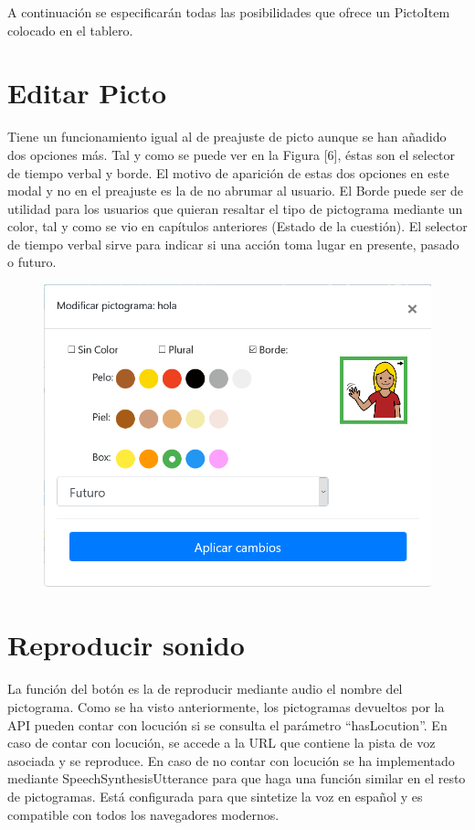 A continuación se especificarán todas las posibilidades que ofrece un PictoItem colocado en el tablero. 


\section*{Editar Picto}

Tiene un funcionamiento igual al de preajuste de picto aunque se han añadido dos opciones más. Tal y como se puede ver en la Figura [6], éstas son el selector de tiempo verbal y  borde. El motivo de aparición de estas dos opciones en este modal y no en el preajuste es la de no abrumar al usuario. El Borde puede ser de utilidad para los usuarios que quieran resaltar el tipo de pictograma mediante un color, tal y como se vio en capítulos anteriores (Estado de la cuestión). El selector de tiempo verbal sirve para indicar si una acción toma lugar en presente, pasado o futuro.

\begin{figure}[h!]
	\centering
	\includegraphics[width=0.7\linewidth]{Imagenes/Bitmap/modalEditarPicto}
	\caption{}
	\label{fig:modaleditarpicto}
\end{figure}


\section*{Reproducir sonido}


La función del botón es la de reproducir mediante audio el nombre del pictograma. Como se ha visto anteriormente, los pictogramas devueltos por la API pueden contar con locución si se consulta el parámetro “hasLocution”. En caso de contar con locución, se accede a la URL que contiene la pista de voz asociada y se reproduce. 
En caso de no contar con locución se ha implementado mediante SpeechSynthesisUtterance para que haga una función similar en el resto de pictogramas. Está configurada para que sintetize la voz en español y es compatible con todos los navegadores modernos.


